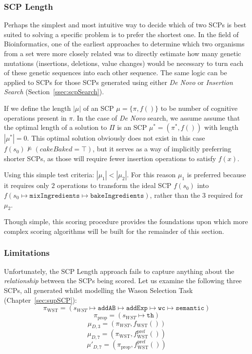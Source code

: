 \subsubsection{SCP Length}
Perhaps the simplest and most intuitive way to decide which of two SCPs is best suited to solving a specific problem is to prefer the shortest one. In the field of Bioinformatics, one of the earliest approaches to determine which two organisms from a set were more closely related was to directly estimate how many genetic mutations (insertions, deletions, value changes) would be necessary to turn each of these genetic sequences into each other sequence. The same logic can be applied to SCPs for those SCPs generated using either \textit{De Novo} or \textit{Insertion Search} (Section~\ref{ssec:scpSearch}).

If we define the length $|\mu|$ of an SCP $\mu=\{\pi,f()\}$ to be number of cognitive operations present in $\pi$. In the case of \textit{De Novo} search, we assume assume that the optimal length of a solution to $\Pi$ is an SCP $\mu^*=(\pi^*,f())$ with length $|\mu^*|=0$. This optimal solution obviously does not exist in this case $f(s_0) \not\models (cakeBaked = \top)$, but it serves as a way of implicitly preferring shorter SCPs, as those will require fewer insertion operations to satisfy $f(x)$. 

Using this simple test criteria: $|\mu_1| < |\mu_2|$. For this reason $\mu_1$ is preferred because it requires only $2$ operations to transform the ideal SCP $f(s_0)$ into $f(s_0\longmapsto \texttt{mixIngredients} \longmapsto \texttt{bakeIngredients})$, rather than the $3$ required for $\mu_2$.

Though simple, this scoring procedure provides the foundations upon which more complex scoring algorithms will be built for the remainder of this section.

\subsubsection*{Limitations}

Unfortunately, the SCP Length approach fails to capture anything about the \textit{relationship} between the SCPs being scored. Let us examine the following three SCPs, all generated whilst modelling the Wason Selection Task (Chapter~\ref{sec:supSCP}):
\[
\pi_\text{WST}=(s_{WST} \longmapsto \texttt{addAB} \longmapsto \texttt{addExp} \longmapsto \texttt{wc} \longmapsto \texttt{semantic})
\]
\[
\pi_\text{prop}=(s_{WST} \longmapsto \texttt{th})
\]
\[
\mu_{D,3}=(\pi_{WST},f_\text{WST}())
\]
\[
\mu_{D,7}=(\pi_\text{WST},f_\text{WST}^\text{pref}())
\]
\[
\mu'_{D,7}=(\pi_\text{prop},f_\text{WST}^\text{pref}())
\]

